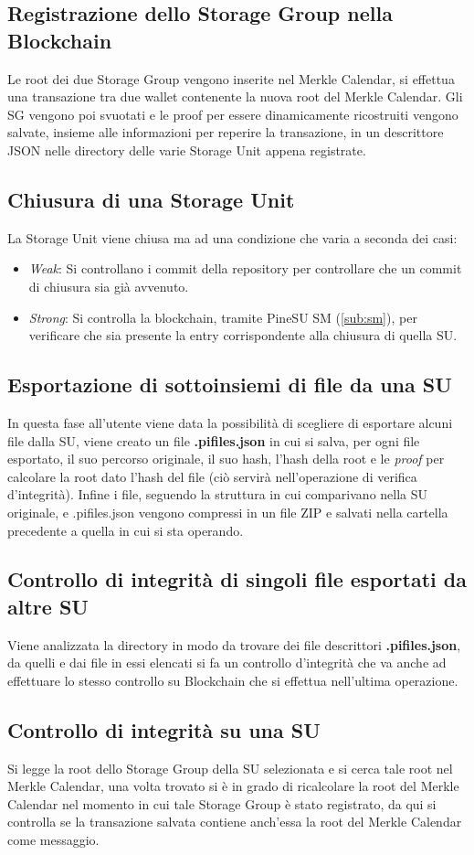 \subsection{Registrazione dello Storage Group nella Blockchain}
Le root dei due Storage Group vengono inserite nel Merkle Calendar, si effettua una transazione tra due wallet contenente la nuova root del Merkle Calendar.
Gli SG vengono poi svuotati e le proof per essere dinamicamente ricostruiti vengono salvate, insieme alle informazioni per reperire la transazione, in un descrittore JSON nelle directory delle varie Storage Unit appena registrate.

\subsection{Chiusura di una Storage Unit}
La Storage Unit viene chiusa ma ad una condizione che varia a seconda dei casi:
\begin{itemize}
    \item \emph{Weak}: Si controllano i commit della repository per controllare che un commit di chiusura sia già avvenuto.
    \item \emph{Strong}: Si controlla la blockchain, tramite PineSU SM (\autoref{sub:sm}), per verificare che sia presente la entry corrispondente alla chiusura di quella SU.
\end{itemize}

\subsection{Esportazione di sottoinsiemi di file da una SU}
In questa fase all’utente viene data la possibilità di scegliere di esportare alcuni file dalla SU, viene creato un file \textbf{.pifiles.json} in cui si salva, per ogni file esportato, il suo percorso originale, il suo hash, l’hash della root e le \emph{proof} per calcolare la root dato l’hash del file (ciò servirà nell’operazione di verifica d’integrità). Infine i file, seguendo la struttura in cui comparivano nella SU originale, e .pifiles.json vengono compressi in un file ZIP e salvati nella cartella precedente a quella in cui si sta operando.

\subsection{Controllo di integrità di singoli file esportati da altre SU}
Viene analizzata la directory in modo da trovare dei file descrittori \textbf{.pifiles.json}, da quelli e dai file in essi elencati si fa un controllo d’integrità che va anche ad effettuare lo stesso controllo su Blockchain che si effettua nell’ultima operazione.

\subsection{Controllo di integrità su una SU}
Si legge la root dello Storage Group della SU selezionata e si cerca tale root nel Merkle Calendar, una volta trovato si è in grado di ricalcolare la root del Merkle Calendar nel momento in cui tale Storage Group è stato registrato, da qui si controlla se la transazione salvata contiene anch’essa la root del Merkle Calendar come messaggio.

